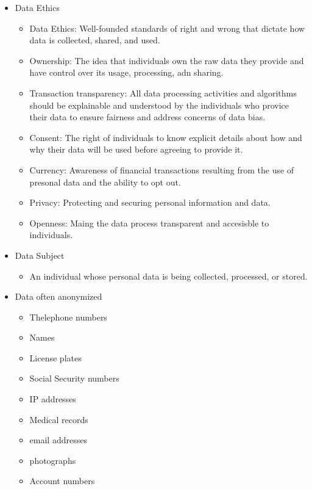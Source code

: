 \documentclass[a4paper]{article}
\begin{document}
\begin{itemize}
        \item Data Ethics 
            \begin{itemize}
                \item Data Ethics: Well-founded standards of right and wrong that dictate how data is collected, shared, and used.
                \item Ownership: The idea that individuals own the raw data they provide and have control over its usage, processing, adn sharing.
                \item Transaction transparency: All data processing activities and algorithms should be explainable and understood by the individuals who provice their data to ensure fairness and address concerns of data bias.
                \item Consent: The right of individuals to know explicit details about how and why their data will be used before agreeing to provide it.
                \item Currency: Awareness of financial transactions resulting from the use of presonal data and the ability to opt out.
                \item Privacy: Protecting and securing personal information and data. 
                \item Openness: Maing the data process transparent and accesisble to individuals.
            \end{itemize}

        \item Data Subject 
            \begin{itemize}
                \item An individual whose personal data is being collected, processed, or stored.
            \end{itemize}

        \item  Data often anonymized
            \begin{itemize}
                \item Thelephone numbers
                \item Names
                \item License plates
                \item Social Security numbers
                \item IP addresses
                \item Medical records
                \item email addresses
                \item photographs
                \item Account numbers
            \end{itemize}



\end{itemize}
\end{document}
